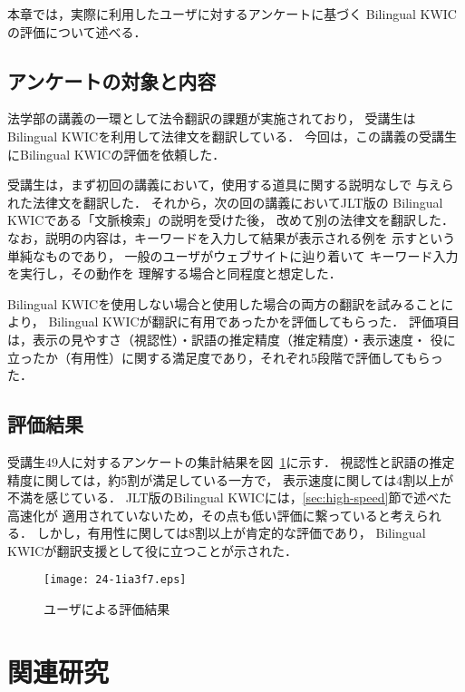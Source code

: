 \documentclass[japanese]{jnlp_1.4}
\begin{document}
本章では，実際に利用したユーザに対するアンケートに基づく
Bilingual KWICの評価について述べる．


\subsection{アンケートの対象と内容}

法学部の講義の一環として法令翻訳の課題が実施されており，
受講生はBilingual KWICを利用して法律文を翻訳している．
今回は，この講義の受講生にBilingual KWICの評価を依頼した．

受講生は，まず初回の講義において，使用する道具に関する説明なしで
与えられた法律文を翻訳した．
それから，次の回の講義においてJLT版の
Bilingual KWICである「文脈検索」の説明を受けた後，
改めて別の法律文を翻訳した．
なお，説明の内容は，キーワードを入力して結果が表示される例を
示すという単純なものであり，
一般のユーザがウェブサイトに辿り着いて
キーワード入力を実行し，その動作を
理解する場合と同程度と想定した．


Bilingual KWICを使用しない場合と使用した場合の両方の翻訳を試みることにより，
 Bilingual KWICが翻訳に有用であったかを評価してもらった．
評価項目は，表示の見やすさ（視認性）・訳語の推定精度（推定精度）・表示速度・
役に立ったか（有用性）に関する満足度であり，それぞれ5段階で評価してもらった．


\subsection{評価結果}

受講生49人に対するアンケートの集計結果を図~\ref{fig:enquete}に示す．
視認性と訳語の推定精度に関しては，約5割が満足している一方で，
表示速度に関しては4割以上が不満を感じている．
JLT版のBilingual KWICには，\ref{sec:high-speed}節で述べた高速化が
適用されていないため，その点も低い評価に繋っていると考えられる．
しかし，有用性に関しては8割以上が肯定的な評価であり，
Bilingual KWICが翻訳支援として役に立つことが示された．

\begin{figure}[t]
\begin{center}
\texttt{[image: 24-1ia3f7.eps]}
\end{center}
\caption{ユーザによる評価結果}
\label{fig:enquete}
\end{figure}


\section{関連研究}
\label{sec:compare}
\end{document}
